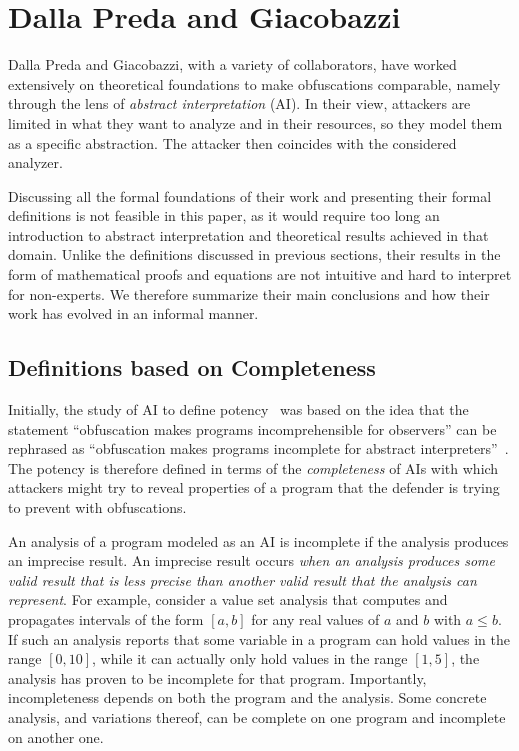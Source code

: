 \section{Dalla Preda and Giacobazzi}
\label{sec:abstract_interpretation}
Dalla Preda and Giacobazzi, with a variety of collaborators, have worked extensively on theoretical foundations to make obfuscations comparable, namely through the lens of \emph{abstract interpretation} (AI). In their view, attackers are limited in what they want to analyze and in their resources, so they model them as a specific abstraction. The attacker then coincides with the considered analyzer.

Discussing all the formal foundations of their work and presenting their formal definitions is not feasible in this paper, as it would require too long an introduction to abstract interpretation and theoretical results achieved in that domain. Unlike the definitions discussed in previous sections, their results in the form of mathematical proofs and equations are not intuitive and hard to interpret for non-experts.  We therefore summarize their main conclusions and how their work has evolved in an informal manner. 



\subsection{Definitions based on Completeness}
\label{sec:completeness}
Initially, the study of AI to define potency~\cite{cousot1977abstract,cousot2021principles} was based on the idea that the statement ``obfuscation makes programs incomprehensible for observers'' can be rephrased as ``obfuscation makes programs incomplete for abstract interpreters''~\cite{2008hiding}. The potency is therefore defined in terms of the \emph{completeness} of AIs with which attackers might try to reveal properties of a program that the defender is trying to prevent with obfuscations. 

An analysis of a program modeled as an AI is incomplete if the analysis produces an imprecise result. An imprecise result occurs \emph{when an analysis produces some valid result that is less precise than another valid result that the analysis can represent}. For example, consider a value set analysis that computes and propagates intervals of the form $[a,b]$ for any real values of $a$ and $b$ with $a \leq b$. If such an analysis reports that some variable in a program can hold values in the range $[0,10]$, while it can actually only hold values in the range $[1,5]$, the analysis has proven to be incomplete for that program. Importantly, incompleteness depends on both the program and the analysis. Some concrete analysis, and variations thereof, can be complete on one program and incomplete on another one. 

